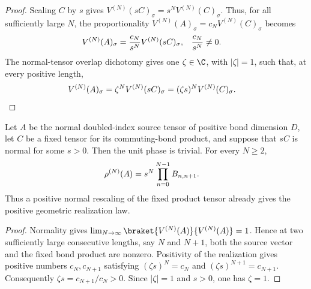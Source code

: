 \begin{proof}\leanok
    Scaling $C$ by $s$ gives
    $V^{(N)}(sC)_\sigma=s^N V^{(N)}(C)_\sigma$.
    Thus, for all sufficiently large $N$, the proportionality
    $V^{(N)}(A)_\sigma=c_NV^{(N)}(C)_\sigma$ becomes
    \begin{align}
        V^{(N)}(A)_\sigma
         & =
        \frac{c_N}{s^N}V^{(N)}(sC)_\sigma,
         & \frac{c_N}{s^N} & \ne0.
        \notag
    \end{align}
    The normal-tensor overlap dichotomy gives one $\zeta\in\C$, with
    $|\zeta|=1$, such that, at every positive length,
    \begin{align}
        V^{(N)}(A)_\sigma
         & =
        \zeta^N V^{(N)}(sC)_\sigma
        =(\zeta s)^N V^{(N)}(C)_\sigma.
        \notag
    \end{align}
\end{proof}

\begin{lemma}
    \label{thm:mpdo_eta_normal_rescaling_positive_geometric_law}
    \leanok
    Let $A$ be the normal doubled-index source tensor of positive bond
    dimension $D$, let $C$ be a fixed tensor for its commuting-bond product,
    and suppose that $sC$ is normal for some $s>0$. Then the unit phase is
    trivial. For every $N\ge2$,
    \begin{align}
        \rho^{(N)}(A)
         & =
        s^N\prod_{n=0}^{N-1}B_{n,n+1}.
        \notag
    \end{align}
    Thus a positive normal rescaling of the fixed product tensor already
    gives the positive geometric realization law.
\end{lemma}

\begin{proof}\leanok
    Normality gives
    $\lim_{N\to\infty}\braket{V^{(N)}(A)}{V^{(N)}(A)}=1$.
    Hence at two sufficiently large consecutive lengths, say $N$ and $N+1$,
    both the source vector and the fixed bond product are nonzero. Positivity
    of the realization gives positive numbers $c_N,c_{N+1}$ satisfying
    $(\zeta s)^N=c_N$ and $(\zeta s)^{N+1}=c_{N+1}$. Consequently
    $\zeta s=c_{N+1}/c_N>0$. Since $|\zeta|=1$ and $s>0$, one has
    $\zeta=1$.
\end{proof}
